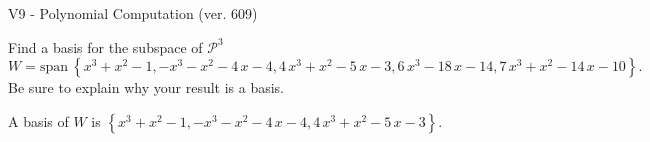 \begin{exercise}
  \begin{exerciseTitle}V9 - Polynomial Computation (ver. 609)\end{exerciseTitle}
  \begin{exerciseStatement}
    Find a basis for the subspace of \(\mathcal{P}^3\) 
\[W=\mathrm{span}\ \left\{x^{3} + x^{2} - 1 , -x^{3} - x^{2} - 4 \, x - 4 , 4 \, x^{3} + x^{2} - 5 \, x - 3 , 6 \, x^{3} - 18 \, x - 14 , 7 \, x^{3} + x^{2} - 14 \, x - 10\right\}.\]
 Be sure to explain why your result is a basis.


  \end{exerciseStatement}
  \begin{exerciseAnswer}
   A basis of \(W\) is  \(\left\{x^{3} + x^{2} - 1 , -x^{3} - x^{2} - 4 \, x - 4 , 4 \, x^{3} + x^{2} - 5 \, x - 3\right\}\).
  


  \end{exerciseAnswer}
\end{exercise}